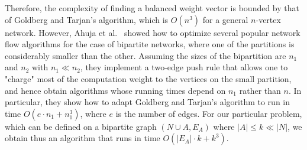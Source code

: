 Therefore, the complexity of finding a balanced weight vector is bounded by that of Goldberg and Tarjan’s algorithm, which is $O(n^3)$ for a general $n$-vertex network. 
However, Ahuja et al.~\cite{ahuja1994improved} showed how to optimize several popular network flow algorithms for the case of bipartite networks, where one of the partitions is considerably smaller than the other. Assuming the sizes of the bipartition are $n_1$ and $n_2$ with $n_1 \ll n_2$, they implement a two-edge push rule that allows one to "charge" most of the computation weight to the vertices on the small partition, and hence obtain algorithms whose running times depend on $n_1$ rather than $n$. 
In particular, they show how to adapt Goldberg and Tarjan’s algorithm to run in time $O(e\cdot n_1+n_1^3)$, where $e$ is the number of edges. 
For our particular problem, which can be defined on a bipartite graph $(N\cup A, E_A)$ where $|A|\leq k\ll |N|$, we obtain thus an algorithm that runs in time $O(|E_A|\cdot k + k^3)$.